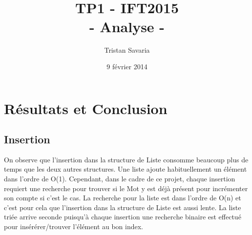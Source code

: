 \documentclass[11pt, french]{article} %
\title{TP1 - IFT2015\\- Analyse -}
\author{Tristan Savaria}
\date{9 février 2014}
\begin{document}
\maketitle
\newpage
\tableofcontents
\newpage
\section{Résultats et Conclusion}
\paragraph{}

\subsection{Insertion}

\begin{figure}[htbp]
\centering
{}
\end{figure}
On observe que l'insertion dans la structure de Liste consomme beaucoup plus de temps que les deux autres structures. Une liste ajoute habituellement un élément dans l'ordre de O(1). 
Cependant, dans le cadre de ce projet, chaque insertion requiert une recherche pour trouver si le Mot y est déjà présent pour incrémenter son compte si c'est le cas. La recherche pour la liste est dans l'ordre de O(n) et c'est pour cela que l'insertion dans la structure de Liste est aussi lente.
\newline
La liste triée arrive seconde puisqu'à chaque insertion une recherche binaire est effectué pour insérérer/trouver l'élément au bon index.
\end{document}
